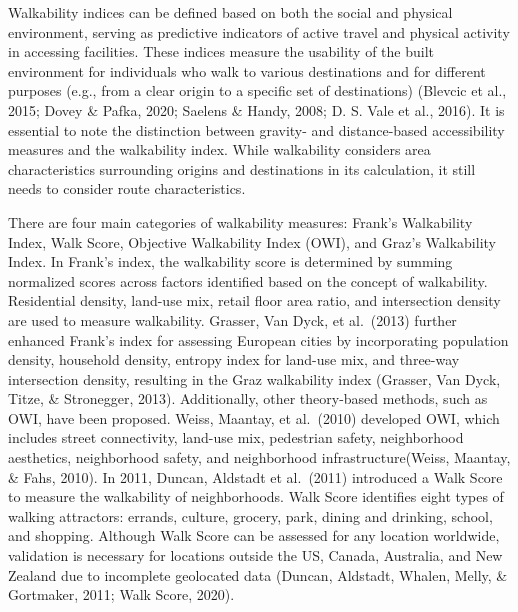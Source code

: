 \documentclass[12pt,twoside]{reedthesis}
\begin{document}
Walkability indices can be defined based on both the social and physical environment, serving as predictive indicators of active travel and physical activity in accessing facilities. These indices measure the usability of the built environment for individuals who walk to various destinations and for different purposes (e.g., from a clear origin to a specific set of destinations) (Blevcic et al., 2015; Dovey \& Pafka, 2020; Saelens \& Handy, 2008; D. S. Vale et al., 2016). It is essential to note the distinction between gravity- and distance-based accessibility measures and the walkability index. While walkability considers area characteristics surrounding origins and destinations in its calculation, it still needs to consider route characteristics.

There are four main categories of walkability measures: Frank's Walkability Index, Walk Score, Objective Walkability Index (OWI), and Graz's Walkability Index. In Frank's index, the walkability score is determined by summing normalized scores across factors identified based on the concept of walkability. Residential density, land-use mix, retail floor area ratio, and intersection density are used to measure walkability. Grasser, Van Dyck, et al.~(2013) further enhanced Frank's index for assessing European cities by incorporating population density, household density, entropy index for land-use mix, and three-way intersection density, resulting in the Graz walkability index (Grasser, Van Dyck, Titze, \& Stronegger, 2013). Additionally, other theory-based methods, such as OWI, have been proposed. Weiss, Maantay, et al.~(2010) developed OWI, which includes street connectivity, land-use mix, pedestrian safety, neighborhood aesthetics, neighborhood safety, and neighborhood infrastructure(Weiss, Maantay, \& Fahs, 2010). In 2011, Duncan, Aldstadt et al.~(2011) introduced a Walk Score to measure the walkability of neighborhoods. Walk Score identifies eight types of walking attractors: errands, culture, grocery, park, dining and drinking, school, and shopping. Although Walk Score can be assessed for any location worldwide, validation is necessary for locations outside the US, Canada, Australia, and New Zealand due to incomplete geolocated data (Duncan, Aldstadt, Whalen, Melly, \& Gortmaker, 2011; Walk Score, 2020).
\end{document}
